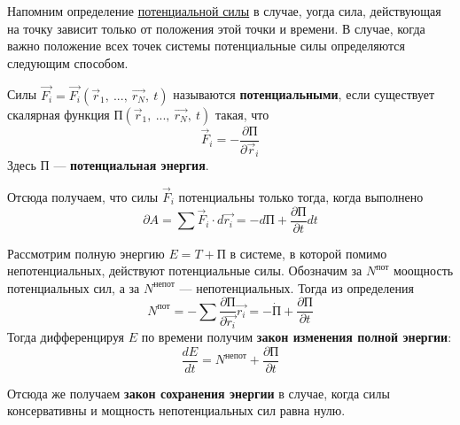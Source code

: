 Напомним определение \hyperlink{def_potential_force}{потенциальной силы} в случае, уогда сила, действующая на точку зависит только от положения этой точки и времени. В случае, когда важно положение всех точек системы потенциальные силы определяются следующим способом.\\

\begin{definition}
    Силы $\vec{F_i} = \vec{F_i}(\vec{r}_1,~ ...,~ \vec{r_N},~t)$ называются \textbf{потенциальными}, если существует скалярная функция П$(\vec{r}_1,~ ...,~ \vec{r_N},~t)$ такая, что
    \[
    \vec{F}_i = - \dfrac{\partial \text{П}}{\partial \vec{r}_i}
    \]
    Здесь П --- \textbf{потенциальная энергия}.
\end{definition}

Отсюда получаем, что силы $\vec{F}_i$ потенциальны только тогда, когда выполнено
\[
\partial A = \sum \vec{F}_i \cdot d\vec{r_i} = -d \text{П} + \dfrac{\partial \text{П}}{\partial t}d t 
\]

Рассмотрим полную энергию $E = T + \text{П}$ в системе, в которой помимо непотенциальных, действуют потенциальные силы. Обозначим за $N^{\text{пот}}$ моощность потенциальных сил, а за $N^{\text{непот}}$ --- непотенциальных. Тогда из определения
\[
N^{\text{пот}} = - \sum \dfrac{\partial \text{П}}{\partial \vec{r_i}}\vec{r_i} = -\dot{\text{П}} + \dfrac{\partial\text{П}}{\partial t}
\]
Тогда дифференцируя $E$ по времени получим \textbf{закон изменения полной энергии}:
\[
\dfrac{d E}{d t} = N^{\text{непот}} + \dfrac{\partial \text{П}}{\partial t}
\]

Отсюда же получаем \textbf{закон сохранения энергии} в случае, когда силы консервативны и мощность непотенциальных сил равна нулю.\\